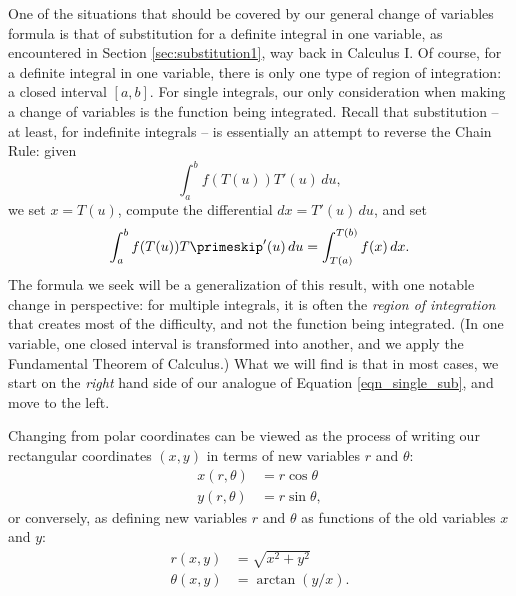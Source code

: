 One of the situations that should be covered by our general change of variables formula is that of substitution for a definite integral in one variable, as encountered in Section \ref{sec:substitution1}, way back in Calculus I. Of course, for a definite integral in one variable, there is only one type of region of integration: a closed interval $[a,b]$. For single integrals, our only consideration when making a change of variables is the function being integrated. Recall that substitution -- at least, for indefinite integrals -- is essentially an attempt to reverse the Chain Rule: given
\[
\int_a^b f(T(u))T'(u)\,du,
\]
we set $x=T(u)$, compute the differential $dx = T'(u)\,du$, and set
\begin{equation}\label{eqn_single_sub}
\int_a^b f(T(u))T\primeskip'(u)\,du = \int_{T(a)}^{T(b)}f(x)\,dx.
\end{equation}
The formula we seek will be a generalization of this result, with one notable change in perspective: for multiple integrals, it is often the \emph{region of integration} that creates most of the difficulty, and not the function being integrated. (In one variable, one closed interval is transformed into another, and we apply the Fundamental Theorem of Calculus.) What we will find is that in most cases, we start on the \emph{right} hand side of our analogue of Equation \eqref{eqn_single_sub}, and move to the left. 



Changing from polar coordinates can be viewed as the process of writing our rectangular coordinates $(x,y)$ in terms of new variables $r$ and $\theta$:
\begin{align*}
x(r,\theta) & = r\cos\theta\\
y(r,\theta) & = r\sin\theta,
\end{align*}
or conversely, as defining new variables $r$ and $\theta$ as functions of the old variables $x$ and $y$:
\begin{align*}
r(x,y) & = \sqrt{x^2+y^2}\\
\theta(x,y) & = \arctan(y/x).
\end{align*}

